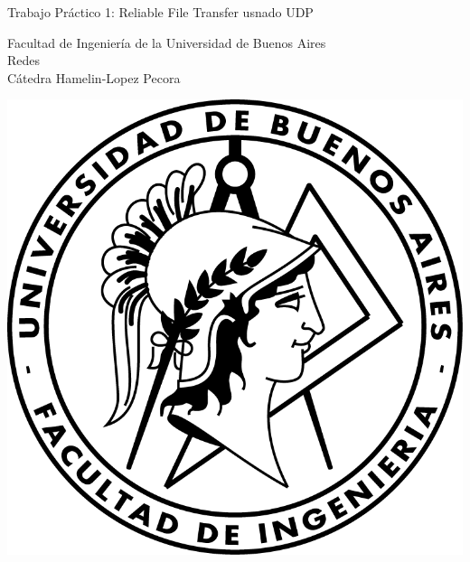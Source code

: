 \documentclass{article}
\begin{document}
\begin{titlepage}
  \vspace*{1cm}

  \begin{center}
    {\Huge{Trabajo Práctico 1: Reliable File Transfer usnado UDP}}
  \end{center}

  \vspace{0.4cm}

  \begin{center}
    {\LARGE{Facultad de Ingeniería de la Universidad de Buenos Aires}}\\
    \vspace{0.3cm}
    {\Large{Redes}}\\
    \vspace{0.3cm}
    {\large{Cátedra Hamelin-Lopez Pecora}}\\
  \end{center}

  \vspace{0.8cm}
  \begin{center}
    \includegraphics[scale=0.8]{Logo-fiuba}
  \end{center}

  \vspace{1.4cm}
  \begin{center}


\end{center}
\end{titlepage}
\end{document}
